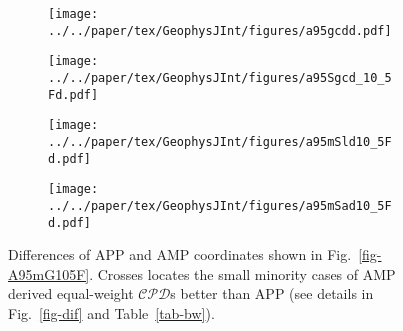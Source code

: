 \begin{figure}[!ht]
  \captionsetup[subfigure]{singlelinecheck=off,justification=raggedright,aboveskip=-6pt,belowskip=-6pt}
  \centering
  \begin{subfigure}[htbp]{.49\textwidth}
    \caption{}\texttt{[image: ../../paper/tex/GeophysJInt/figures/a95gcdd.pdf]}\label{fig-A95GCD105Fd}
  \end{subfigure}
  \begin{subfigure}[htbp]{.49\textwidth}
    \caption{}\texttt{[image: ../../paper/tex/GeophysJInt/figures/a95Sgcd\_10\_5Fd.pdf]}\label{fig-A95SGCD105Fd}
  \end{subfigure}
  \begin{subfigure}[htbp]{.49\textwidth}
    \caption{}\texttt{[image: ../../paper/tex/GeophysJInt/figures/a95mSld10\_5Fd.pdf]}\label{fig-A95mSld105Fd}
  \end{subfigure}
  \begin{subfigure}[htbp]{.49\textwidth}
    \caption{}\texttt{[image: ../../paper/tex/GeophysJInt/figures/a95mSad10\_5Fd.pdf]}\label{fig-A95mSad105Fd}
  \end{subfigure}
  \caption[APP spatially better than AMP (dot)]{Differences of APP and AMP
    coordinates shown in Fig.~\ref{fig-A95mG105F}. Crosses locates the small
    minority cases of AMP derived equal-weight $\mathcal{CPD}$s better than APP
    (see details in Fig.~\ref{fig-dif} and
    Table~\ref{tab-bw}).}\label{fig-A95mG105Fd}
\end{figure}

